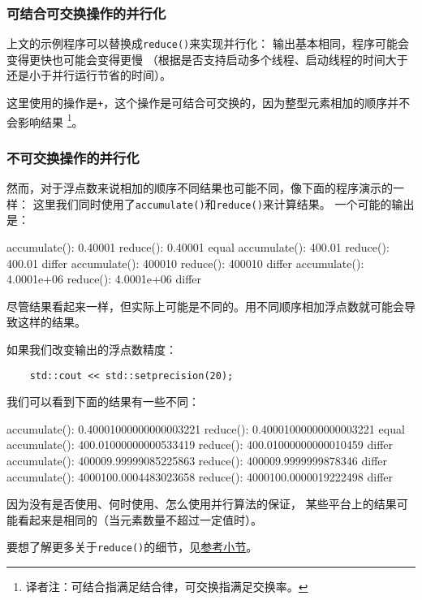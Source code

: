 \subsubsection{可结合可交换操作的并行化}\label{ch22.6.1.1}
上文的示例程序可以替换成\texttt{reduce()}来实现并行化：
输出基本相同，程序可能会变得更快也可能会变得更慢
（根据是否支持启动多个线程、启动线程的时间大于还是小于并行运行节省的时间）。

这里使用的操作是\texttt{+}，这个操作是可结合可交换的，因为整型元素相加的顺序并不会影响结果
\footnote{译者注：可结合指满足结合律，可交换指满足交换率。}。

\subsubsection{不可交换操作的并行化}
然而，对于浮点数来说相加的顺序不同结果也可能不同，像下面的程序演示的一样：
这里我们同时使用了\texttt{accumulate()}和\texttt{reduce()}来计算结果。
一个可能的输出是：
\begin{blacklisting}
    accumulate(): 0.40001
    reduce():     0.40001
    equal
    accumulate(): 400.01
    reduce():     400.01
    differ
    accumulate(): 400010
    reduce():     400010
    differ
    accumulate(): 4.0001e+06
    reduce():     4.0001e+06
    differ
\end{blacklisting}
尽管结果看起来一样，但实际上可能是不同的。用不同顺序相加浮点数就可能会导致这样的结果。

如果我们改变输出的浮点数精度：
\begin{lstlisting}
    std::cout << std::setprecision(20);
\end{lstlisting}
我们可以看到下面的结果有一些不同：
\begin{blacklisting}
    accumulate(): 0.40001000000000003221
    reduce():     0.40001000000000003221
    equal
    accumulate(): 400.01000000000533419
    reduce():     400.01000000000010459
    differ
    accumulate(): 400009.99999085225863
    reduce():     400009.9999999878346
    differ
    accumulate(): 4000100.0004483023658
    reduce():     4000100.0000019222498
    differ
\end{blacklisting}
因为没有是否使用、何时使用、怎么使用并行算法的保证，
某些平台上的结果可能看起来是相同的（当元素数量不超过一定值时）。

要想了解更多关于\texttt{reduce()}的细节，见\hyperref[ch23.2.1]{参考小节}。

